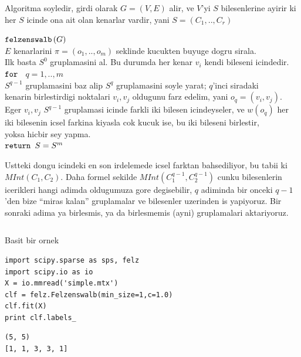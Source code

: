 \documentclass[12pt,fleqn]{article}\usepackage{../common}
\begin{document}
Algoritma soyledir, girdi olarak $G=(V,E)$ alir, ve $V$'yi $S$
bilesenlerine ayirir ki her $S$ icinde ona ait olan kenarlar vardir, yani
$S=(C_1,..,C_r)$ 

\begin{algorithm}[h]
\begin{pseudocode}
\codename $\mbox{\texttt{felzenswalb}}\left(G\right)$\\
\codeline \> $E$ kenarlarini $\pi = (o_1,..,o_m)$ seklinde kucukten buyuge dogru sirala. \\
\codeline \> Ilk basta $S^0$ gruplamasini al. Bu durumda her kenar $v_i$
kendi bileseni icindedir. \\ 
\codeline \> $\mbox{\texttt{for }}$ $q = 1,..,m$ \\
\codeline \> \> $S^{q-1}$ gruplamasini baz alip $S^q$ gruplamasini soyle
yarat; $q$'inci siradaki  \\
\codeline \> \> kenarin birlestirdigi noktalari $v_i,v_j$ oldugunu farz
edelim, yani $o_q = (v_i,v_j)$. \\ 
\codeline \> \> Eger $v_i,v_j$ $S^{q-1}$ gruplamasi icinde farkli iki
bilesen icindeyseler, ve $w(o_q)$ her  \\
\codeline \> \> iki bilesenin icsel farkina kiyasla cok kucuk ise, bu iki
bileseni birlestir, \\ 
\codeline \> \> yoksa hicbir sey yapma. \\
\codeline \> $\mbox{\texttt{return }} S=S^m$ 
\end{pseudocode}
\end{algorithm}

Ustteki dongu icindeki en son irdelemede icsel farktan bahsediliyor, bu
tabii ki $MInt(C_1,C_2)$. Daha formel sekilde $MInt(C_1^{q-1},C_2^{q-1})$
cunku bilesenlerin icerikleri hangi adimda oldugumuza gore degisebilir, $q$
adiminda bir onceki $q-1$'den bize ``miras kalan'' gruplamalar ve
bilesenler uzerinden is yapiyoruz. Bir sonraki adima ya birlesmis, ya da
birlesmemis (ayni) gruplamalari aktariyoruz. 

\inputminted[fontsize=\footnotesize]{python}{felz.py}

Basit bir ornek

\begin{verbatim}
import scipy.sparse as sps, felz
import scipy.io as io
X = io.mmread('simple.mtx')
clf = felz.Felzenswalb(min_size=1,c=1.0)
clf.fit(X)
print clf.labels_    
\end{verbatim}

\begin{verbatim}
(5, 5)
[1, 1, 3, 3, 1]
\end{verbatim}
\end{document}
